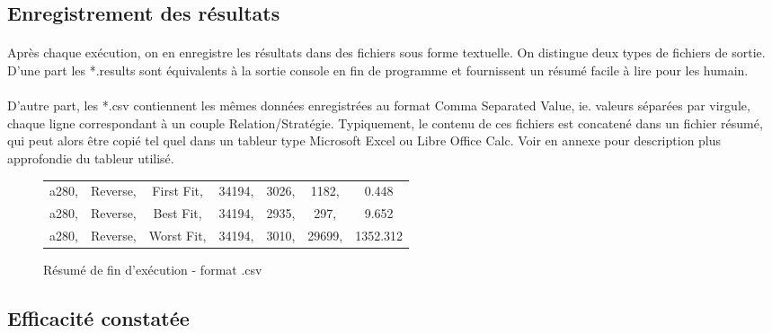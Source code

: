 \documentclass[a4paper,10pt]{report}
\begin{document}
\subsection{Enregistrement des résultats}

\paragraph{}
  Après chaque exécution, on en enregistre les résultats dans des fichiers sous forme textuelle. On distingue deux
types de fichiers de sortie. D'une part les *.results sont équivalents à la sortie console en fin de programme et
fournissent un résumé facile à lire pour les humain.
\paragraph{}
  D'autre part, les *.csv contiennent les mêmes données enregistrées au format Comma Separated Value, ie. valeurs
séparées par virgule, chaque ligne correspondant à un couple Relation/Stratégie. Typiquement, le contenu de ces 
fichiers est concatené dans un fichier résumé, qui peut alors être copié tel quel dans un tableur type Microsoft
Excel ou Libre Office Calc. Voir en annexe pour description plus approfondie du tableur utilisé.

\begin{figure}[h]
  \begin{tabular}{ccccccc}
    a280, &Reverse, &First Fit, &34194, &3026, &1182, &0.448\\
    a280, &Reverse, &Best Fit,  &34194, &2935, &297,  &9.652\\
    a280, &Reverse, &Worst Fit, &34194, &3010, &29699,&1352.312\\
  \end{tabular}
  \label{a280-sample-csv}
  \caption{Résumé de fin d'exécution - format .csv}
\end{figure}


\subsection{Efficacité constatée}

\begin{figure}[h]
  \begin{tabular}{c}
    
  \end{tabular}
 \label{recap-general}
 
\end{figure}
\end{document}
